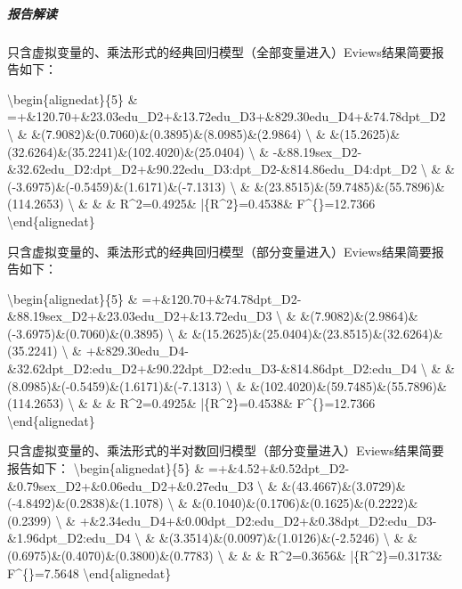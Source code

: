\documentclass[12pt,(landscape,a4paper),(portrait,a4paper)]{article}
\let\oldsubparagraph\subparagraph
\renewcommand{\subparagraph}[1]{\oldsubparagraph{#1}\mbox{}}
\theoremstyle{definition}
\theoremstyle{definition}
\theoremstyle{definition}
\theoremstyle{remark}
\begin{document}
\hypertarget{-1}{%
\subparagraph{报告解读}\label{-1}}

只含虚拟变量的、乘法形式的经典回归模型（全部变量进入）Eviews结果简要报告如下：

\textbackslash{}begin\{alignedat\}\{5\} \&
=+\&120.70+\&23.03edu\_D2+\&13.72edu\_D3+\&829.30edu\_D4+\&74.78dpt\_D2
\textbackslash{} \&
\&(7.9082)\&(0.7060)\&(0.3895)\&(8.0985)\&(2.9864)
\textbackslash{} \&
\&(15.2625)\&(32.6264)\&(35.2241)\&(102.4020)\&(25.0404)
\textbackslash{} \&
\quad-\&88.19sex\_D2-\&32.62edu\_D2:dpt\_D2+\&90.22edu\_D3:dpt\_D2-\&814.86edu\_D4:dpt\_D2
\textbackslash{} \&
\&(-3.6975)\&(-0.5459)\&(1.6171)\&(-7.1313) \textbackslash{}
\& \&(23.8515)\&(59.7485)\&(55.7896)\&(114.2653)
\textbackslash{} \& \& \quad\& R\^{}2=0.4925\&
\bar\{R\^{}2\}=0.4538\& F\^{}\{\ast\}=12.7366
\textbackslash{}end\{alignedat\}

只含虚拟变量的、乘法形式的经典回归模型（部分变量进入）Eviews结果简要报告如下：

\textbackslash{}begin\{alignedat\}\{5\} \&
=+\&120.70+\&74.78dpt\_D2-\&88.19sex\_D2+\&23.03edu\_D2+\&13.72edu\_D3
\textbackslash{} \&
\&(7.9082)\&(2.9864)\&(-3.6975)\&(0.7060)\&(0.3895)
\textbackslash{} \&
\&(15.2625)\&(25.0404)\&(23.8515)\&(32.6264)\&(35.2241)
\textbackslash{} \&
\quad+\&829.30edu\_D4-\&32.62dpt\_D2:edu\_D2+\&90.22dpt\_D2:edu\_D3-\&814.86dpt\_D2:edu\_D4
\textbackslash{} \& \&(8.0985)\&(-0.5459)\&(1.6171)\&(-7.1313)
\textbackslash{} \&
\&(102.4020)\&(59.7485)\&(55.7896)\&(114.2653)
\textbackslash{} \& \& \quad\& R\^{}2=0.4925\&
\bar\{R\^{}2\}=0.4538\& F\^{}\{\ast\}=12.7366
\textbackslash{}end\{alignedat\}

只含虚拟变量的、乘法形式的半对数回归模型（部分变量进入）Eviews结果简要报告如下：
\textbackslash{}begin\{alignedat\}\{5\} \&
=+\&4.52+\&0.52dpt\_D2-\&0.79sex\_D2+\&0.06edu\_D2+\&0.27edu\_D3
\textbackslash{} \&
\&(43.4667)\&(3.0729)\&(-4.8492)\&(0.2838)\&(1.1078)
\textbackslash{} \&
\&(0.1040)\&(0.1706)\&(0.1625)\&(0.2222)\&(0.2399)
\textbackslash{} \&
\quad+\&2.34edu\_D4+\&0.00dpt\_D2:edu\_D2+\&0.38dpt\_D2:edu\_D3-\&1.96dpt\_D2:edu\_D4
\textbackslash{} \& \&(3.3514)\&(0.0097)\&(1.0126)\&(-2.5246)
\textbackslash{} \& \&(0.6975)\&(0.4070)\&(0.3800)\&(0.7783)
\textbackslash{} \& \& \quad\& R\^{}2=0.3656\&
\bar\{R\^{}2\}=0.3173\& F\^{}\{\ast\}=7.5648
\textbackslash{}end\{alignedat\}
\end{document}
